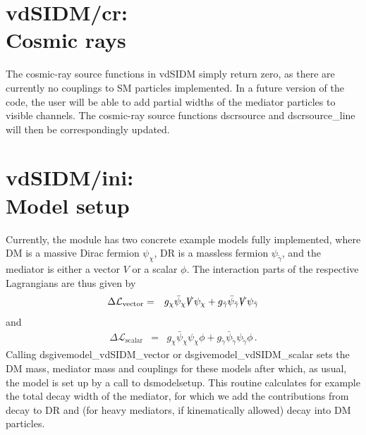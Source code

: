 \documentclass[a4paper,10pt,oneside]{book}
\newcommand{\bea}{\begin{eqnarray}}
\newcommand{\eea}{\end{eqnarray}}
\newcommand{\code}[1]{\ft{#1}}
\newcommand{\codeb}[1]{\ftb{#1}}
\newcommand{\ft}[1]{\textsf{#1}}
\newcommand{\ftb}[1]{{\bfseries \sffamily #1}}
\begin{document}
\section[vdSIDM/cr: Cosmic rays]{\codeb{vdSIDM/cr}:\\ Cosmic rays}
\label{sec:src_models/vdSIDM/cr}

\label{ch:vdSIDM_cr}

The cosmic-ray source functions in \code{vdSIDM} simply return zero, as there are currently no 
couplings to SM particles implemented. In a future version of the code, the user will be able to
add partial widths of the mediator particles to visible channels. The  cosmic-ray source functions
\code{dscrsource} and \code{dscrsource\_line} will then be correspondingly updated.
\section[vdSIDM/ini: Model setup]{\codeb{vdSIDM/ini}:\\ Model setup}
\label{sec:src_models/vdSIDM/ini}

\label{ch:vdSIDM_ini}

Currently, the 
module has two concrete example models fully implemented, where DM is a massive Dirac fermion
$\psi_\chi$, DR is a massless fermion $\psi_{\tilde \gamma}$, and the mediator is either a vector $V$
or a scalar $\phi$. The interaction parts of the respective
Lagrangians are thus given by 
\bea
\label{sidm_vector}
\Delta \mathcal{L}_\mathrm{vector}& =&  g_\chi \bar\psi_{\chi} \slashed{V} \psi_{\chi}+g_{\tilde \gamma} \bar\psi_{\tilde \gamma} \slashed{V} \psi_{\tilde \gamma}
\eea
and
\bea
\label{sidm_scalar}
\Delta \mathcal{L}_\mathrm{scalar}& =&   g_\chi \bar\psi_\chi \psi_\chi \phi +g_{\tilde \gamma} \bar\psi_{\tilde \gamma} \psi_{\tilde \gamma} \phi \,.
\eea
Calling \code{dsgivemodel\_vdSIDM\_vector} or \code{dsgivemodel\_vdSIDM\_scalar} sets the
DM mass, mediator mass  and couplings for these models after which, as usual, the model is set up by 
a call to \code{dsmodelsetup}. This routine calculates for example the total decay width of the mediator, for which we add
the contributions from decay to DR and (for heavy mediators, if kinematically allowed) decay into DM particles.

\end{document}
